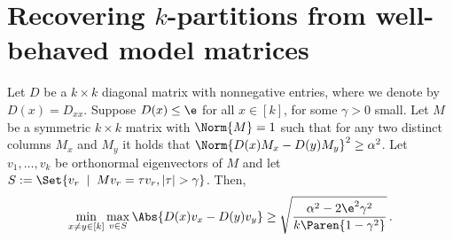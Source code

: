 \section{Recovering $k$-partitions from well-behaved model matrices}\label{sec: partition_general}

\begin{lemma}\label{lem: eigenvectorsdistinguish}
    Let $D$ be a $k\times k$ diagonal matrix with nonnegative entries, where we denote by $D(x) = D_{xx}$.
    Suppose $D(x) \leq \e$ for all $x \in [k]$, for some $\gamma > 0$ small.
    Let $M$ be a symmetric $k\times k$ matrix with $\Norm{M}=1$ such that for any two distinct columns $M_x$ and $M_y$ it holds that $\Norm{D(x)M_x-D(y)M_y}^2 \geq \alpha^2$.
    Let $v_1, \ldots, v_k$ be orthonormal eigenvectors of $M$ and let $S:=\Set{v_r \; \mid\; M v_r = \tau v_r, |\tau| > \gamma}$.
    Then,
    $$\min_{x\neq y\in[k]}\max_{v\in S} \Abs{D(x) v_x-D(y) v_y}\geq \sqrt{\frac{\alpha^2-2\e^2\gamma^2}{k\Paren{1-\gamma^2}}} \,.$$
\end{lemma}

